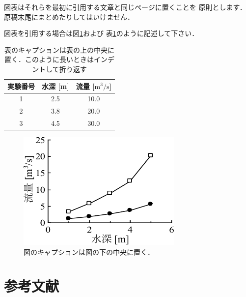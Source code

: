 \documentclass[a4j,10pt]{jsarticle}
\begin{document}
図表はそれらを最初に引用する文章と同じページに置くことを
原則とします．原稿末尾にまとめたりしてはいけません．

図表を引用する場合は図\ref{fig:sample}および
表\ref{table:sample}のように記述して下さい．

\begin{table}[t]
  \centering
  \caption{表のキャプションは表の上の中央に置く．このように長いときはインデントして折り返す}
  \label{table:sample}
  \vspace{0pt} %
  \begin{tabular}{|c|c|c|} \hline
    実験番号 & 水深 [m] & 流量 [$\mathrm{m}^3/\mathrm{s}$] \\ \hline
    1 & 2.5 & 10.0 \\ \hline
    2 & 3.8 & 20.0 \\ \hline
    3 & 4.5 & 30.0 \\ \hline
  \end{tabular}
  \vspace{10pt} %
\end{table}

\begin{figure}[t]
  \centering
  \vspace{0pt} %
  \includegraphics[width=0.75\columnwidth]{graph.pdf}
  \vspace{0pt} %
  \caption{図のキャプションは図の下の中央に置く．}
  \vspace{0pt} %
  \label{fig:sample}
\end{figure}

\section{参考文献}
\end{document}
